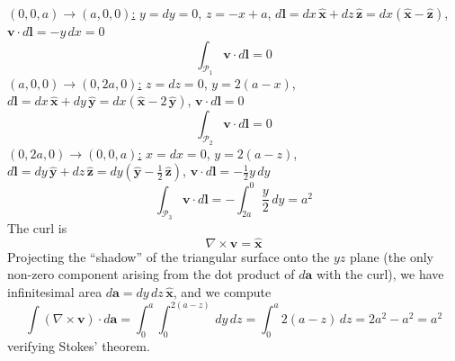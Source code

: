 \documentclass[a4paper]{article}
\begin{document}
\underline{\( \!\left( 0,0,a \right) \rightarrow \!\left( a,0,0 \right) \):} \( y = dy = 0 \), \( z = -x + a \), \( d \pmb{l} = dx \, \pmb{\hat{x}} + dz \, \pmb{\hat{z}} = dx \!\left( \pmb{\hat{x}} - \pmb{\hat{z}} \right) \), \( \pmb{v} \cdot d \pmb{l} = -y \, dx = 0 \)
\[
	\int_{\mathcal{P}_{1}} \pmb{v} \cdot d \pmb{l} = 0 
\]
\underline{\( \!\left( a,0,0 \right) \rightarrow \!\left( 0,2a,0 \right) \):} \( z = dz = 0 \), \( y = 2 \!\left( a - x \right) \), \( d \pmb{l} = dx \, \pmb{\hat{x}} + dy \, \pmb{\hat{y}} = dx \!\left( \pmb{\hat{x}} - 2 \, \pmb{\hat{y}} \right) \), \( \pmb{v} \cdot d \pmb{l} = 0 \)
\[
	\int_{\mathcal{P}_{2}} \pmb{v} \cdot d \pmb{l} = 0 
\]
\underline{\( \!\left( 0,2a,0 \right) \rightarrow \!\left( 0,0,a \right) \):} \( x = dx = 0 \), \( y = 2 \!\left( a - z \right) \), \( d \pmb{l} = dy \, \pmb{\hat{y}} + dz \, \pmb{\hat{z}} = dy \!\left( \pmb{\hat{y}} - \frac{1}{2} \, \pmb{\hat{z}} \right) \), \( \pmb{v} \cdot d \pmb{l} = -\frac{1}{2}y \, dy \)
\[
	\int_{\mathcal{P}_{3}} \pmb{v} \cdot d \pmb{l} = -\int^{0}_{2a} \frac{y}{2} \, dy = a^{2}
\]
The curl is
\[
	\nabla \times \pmb{v} = \pmb{\hat{x}} 
\]
Projecting the ``shadow'' of the triangular surface onto the \( yz \) plane (the only non-zero component arising from the dot product of \( d \pmb{a} \) with the curl), we have infinitesimal area \( d \pmb{a} = dy \, dz \, \pmb{\hat{x}} \), and we compute
\[
	\int \!\left( \nabla \times \pmb{v} \right) \cdot d \pmb{a} = \int^{a}_{0} \int^{2 \!\left( a - z \right)}_{0} \, dy \, dz = \int^{a}_{0} 2\!\left( a - z \right) \, dz = 2a^{2} - a^{2} = a^{2}
\]
verifying Stokes' theorem.

\vspace{12pt}

\end{document}
